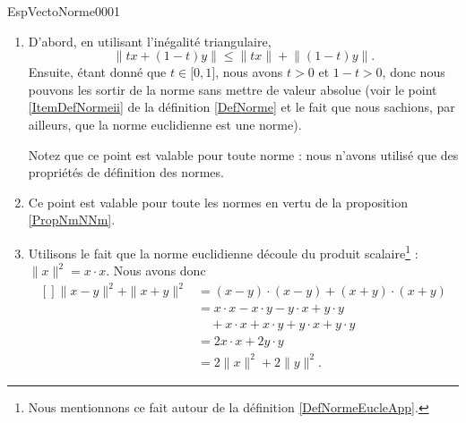 \begin{corrige}{EspVectoNorme0001}

	\begin{enumerate}
		\item
			D'abord, en utilisant l'inégalité triangulaire, 
			\begin{equation}
				\| tx+(1-t)y \|\leq \| tx \|+\big\| (1-t)y \big\|.
			\end{equation}
			Ensuite, étant donné que $t\in\mathopen[ 0 , 1 \mathclose]$, nous avons $t>0$ et $1-t>0$, donc nous pouvons les sortir de la norme sans mettre de valeur absolue (voir le point \ref{ItemDefNormeii} de la définition \ref{DefNorme} et le fait que nous sachions, par ailleurs, que la norme euclidienne est une norme).

			Notez que ce point est valable pour toute norme : nous n'avons utilisé que des propriétés de définition des normes.


		\item
			Ce point est valable pour toute les normes en vertu de la proposition \ref{PropNmNNm}.

		\item
			Utilisons le fait que la norme euclidienne découle du produit scalaire\footnote{Nous mentionnons ce fait autour de la définition \ref{DefNormeEucleApp}.} : $\| x \|^2=x\cdot x$. Nous avons donc
			\begin{equation}
				\begin{aligned}[]
					\| x-y \|^2+\| x+y \|^2&=(x-y)\cdot (x-y)+(x+y)\cdot(x+y)\\
					&=x\cdot x-x\cdot y-y\cdot x+y\cdot y\\
					&\quad +x\cdot x+x\cdot y+y\cdot x+y\cdot y\\
					&=2x\cdot x+2y\cdot y\\
					&=2\| x \|^2+2\| y \|^2.
				\end{aligned}
			\end{equation}
			
	\end{enumerate}

\end{corrige}
